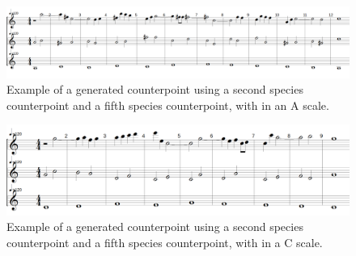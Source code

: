 \begin{figure}[h]
    \centering
    \includegraphics[width=1\textwidth]{Images/Musicality/musicality-5sp-la.png}
    \caption{Example of a generated counterpoint using a second species counterpoint and a fifth species counterpoint, with in an A scale.}
    \label{fig:musicality-5sp-la}
\end{figure}

\begin{figure}[h]
    \centering
    \includegraphics[width=1\textwidth]{Images/Musicality/musicality-5sp-do.png}
    \caption{Example of a generated counterpoint using a second species counterpoint and a fifth species counterpoint, with in a C scale.}
    \label{fig:musicality-5sp-do}
\end{figure}
